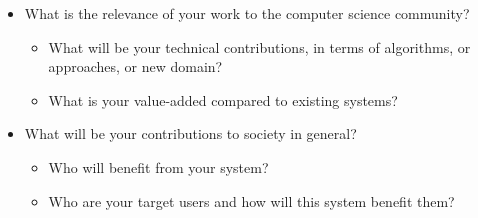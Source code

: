 %
%
\begin{itemize}
\item  What is the relevance of your work to the computer science community? 

\begin{itemize} 
\item What will be your technical contributions, in terms of algorithms, or approaches, or new domain? 
\item What is your value-added compared to existing systems? 
\end{itemize}

\item What will be your contributions to society in general? 
    \begin{itemize}
      \item Who will benefit from your system? 
      \item Who are your target users and how will this system benefit them? 
   \end{itemize}
\end{itemize}

\begin{comment}
If applicable, describe possible commercialization and/or innovation in your research.
\end{comment}


